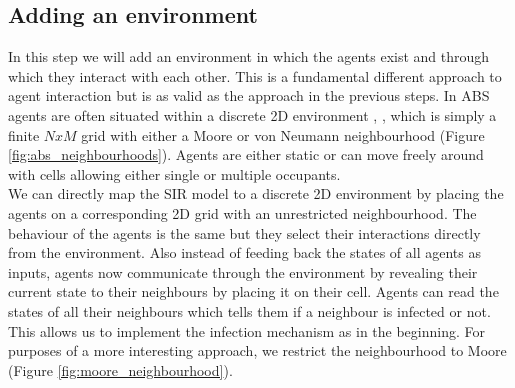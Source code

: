 \subsection{Adding an environment}
\label{sec:step5_environment}
In this step we will add an environment in which the agents exist and through which they interact with each other. This is a fundamental different approach to agent interaction but is as valid as the approach in the previous steps.
In ABS agents are often situated within a discrete 2D environment \cite{schelling_dynamic_1971}, \cite{epstein_growing_1996}, \cite{epstein_agent_zero:_2014} which is simply a finite $N x M$ grid with either a Moore or von Neumann neighbourhood (Figure \ref{fig:abs_neighbourhoods}). Agents are either static or can move freely around with cells allowing either single or multiple occupants. \\
We can directly map the SIR model to a discrete 2D environment by placing the agents on a corresponding 2D grid with an unrestricted neighbourhood. The behaviour of the agents is the same but they select their interactions directly from the environment. Also instead of feeding back the states of all agents as inputs, agents now communicate through the environment by revealing their current state to their neighbours by placing it on their cell. Agents can read the states of all their neighbours which tells them if a neighbour is infected or not. This allows us to implement the infection mechanism as in the beginning. For purposes of a more interesting approach, we restrict the neighbourhood to Moore (Figure \ref{fig:moore_neighbourhood}).

